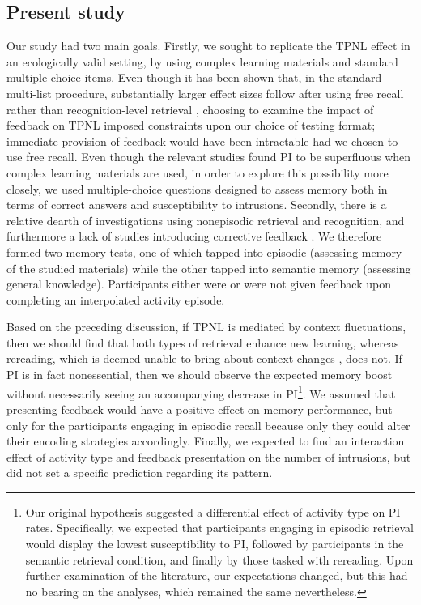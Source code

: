 \documentclass[../main.tex]{subfiles}
\begin{document}
\subsection{Present study\label{present}}

Our study had two main goals. Firstly, we sought to replicate the TPNL 
effect in an ecologically valid setting, by using complex learning materials 
and standard multiple-choice items. Even though it has been shown that, in 
the standard multi-list procedure, substantially larger effect sizes follow 
after using free recall rather than recognition-level retrieval 
 \citep{chanRetrievalPotentiatesNew2018}, choosing to examine the impact of 
feedback on TPNL imposed constraints upon our choice of testing format; 
immediate provision of feedback would have been intractable had we chosen 
to use free recall. Even though the relevant studies found PI to be 
superfluous when complex learning materials are used, in order to explore 
this possibility more closely, we used multiple-choice questions designed to 
assess memory both in terms of correct answers and susceptibility to 
intrusions. Secondly, there is a relative dearth of investigations using 
nonepisodic retrieval and recognition, and furthermore a lack of studies 
introducing corrective feedback \citep{chanRetrievalPotentiatesNew2018}. We 
therefore formed two memory tests, one of which tapped into episodic 
(assessing memory of the studied materials) while the other tapped into 
semantic memory (assessing general knowledge). Participants either were or 
were not given feedback upon completing an interpolated activity episode.

Based on the preceding discussion, if TPNL is mediated by context 
fluctuations, then we should find that both types of retrieval enhance new 
learning, whereas rereading, which is deemed unable to bring about context 
changes \citep{chanRetrievalPotentiatesNew2018}, does not. If PI is in fact 
nonessential, then we should observe the expected memory boost without 
necessarily seeing an accompanying decrease in PI\footnote{Our original 
hypothesis suggested a differential effect of activity type on PI rates. 
Specifically, we expected that participants engaging in episodic retrieval 
would display the lowest susceptibility to PI, followed by participants in 
the semantic retrieval condition, and finally by those tasked with 
rereading. Upon further examination of the literature, our expectations 
changed, but this had no bearing on the analyses, which remained the same 
nevertheless.}. We assumed that presenting feedback would have a positive 
effect on memory performance, but only for the participants engaging in 
episodic recall because only they could alter their encoding strategies 
accordingly. Finally, we expected to find an interaction effect of activity 
type and feedback presentation on the number of intrusions, but did not set 
a specific prediction regarding its pattern.


{
	\biblio
}
\end{document}
